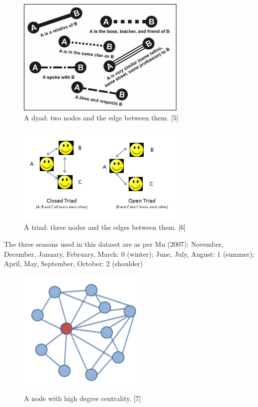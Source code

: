 \documentclass[conference,letterpaper]{IEEEtran}
\begin{document}
\begin{center}
\begin{figure}[hb]
\centering
\includegraphics[width=3.2in]{f03}
\caption{
A dyad: two nodes and the edge between them. [5]
}
\label{fig_sim}
\end{figure}
\end{center}

\begin{center}
\begin{figure}[hb]
\centering
\includegraphics[width=3.2in]{open-triad}
\caption{
A triad: three nodes and the edges between them. [6]
}
\label{fig_sim}
\end{figure}
\end{center}


The three seasons used in this dataset are as per Mu (2007): 
November, December, January, February, March: 0 (winter); 
June, July, August: 1 (summer); 
April, May, September, October: 2 (shoulder) \\

\begin{center}
\begin{figure}[hb]
\centering
\includegraphics[width=2.5in]{ego_network}
\caption{
A node with high degree centrality. [7]
}
\label{fig_sim}
\end{figure}
\end{center}
\end{document}
